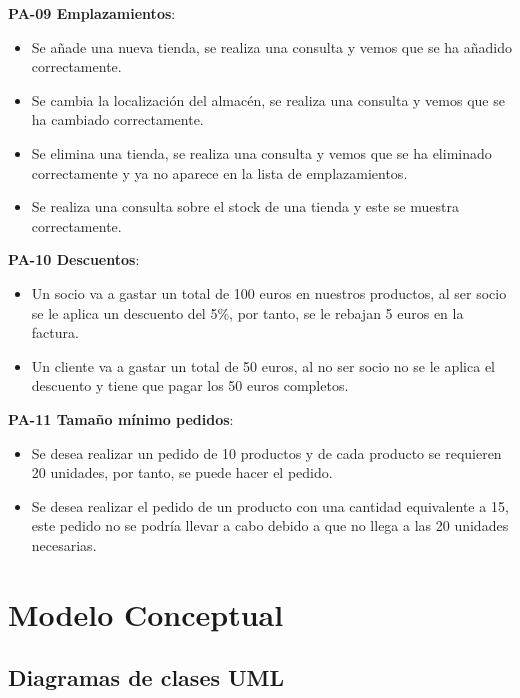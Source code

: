 \textbf{PA-09 Emplazamientos}:
\begin{itemize}
	\item Se añade una nueva tienda, se realiza una consulta y vemos que se ha añadido correctamente.
	\item Se cambia la localización del almacén, se realiza una consulta y vemos que se ha cambiado correctamente.
	\item Se elimina una tienda, se realiza una consulta y vemos que se ha eliminado correctamente y ya no aparece en la lista de emplazamientos.
	\item Se realiza una consulta sobre el stock de una tienda y este se muestra correctamente.
\end{itemize}

\textbf{PA-10 Descuentos}:
\begin{itemize}
	\item Un socio va a gastar un total de 100 euros en nuestros productos, al ser socio se le aplica un descuento del 5\%, por tanto, se le rebajan 5 euros en la factura.
	\item Un cliente va a gastar un total de 50 euros, al no ser socio no se le aplica el descuento y tiene que pagar los 50 euros completos.
\end{itemize}

\textbf{PA-11 Tamaño mínimo pedidos}:
\begin{itemize}
	\item Se desea realizar un pedido de 10 productos y de cada producto se requieren 20 unidades, por tanto, se puede hacer el pedido.
	\item Se desea realizar el pedido de un producto con una cantidad equivalente a 15, este pedido no se podría llevar a cabo debido a que no llega a las 20 unidades necesarias.
\end{itemize}


\section{Modelo Conceptual}
\subsection{Diagramas de clases UML}

